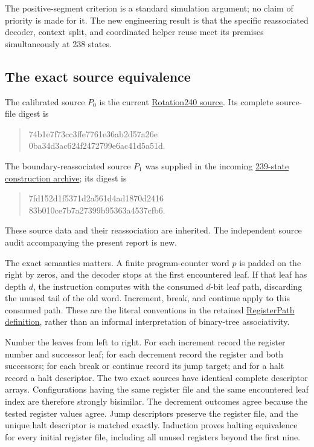 The positive-segment criterion is a standard simulation argument; no claim
of priority is made for it.  The new engineering result is that the
specific reassociated decoder, context split, and coordinated helper reuse
meet its premises simultaneously at 238 states.

\subsection{The exact source equivalence}

The calibrated source $P_0$ is the current
\href{https://github.com/VladimirReshetnikov/ProveIt/blob/ce192939372ac7944fe2a0208c68a96d49fb5e3b/Computability/BusyBeaver/Research/ZFC/candidate-rotation240/sites_logical.json}
{Rotation240 source}.  Its complete source-file digest is
\begin{quote}\small\ttfamily
74b1e7f73cc3ffe7761e36ab2d57a26e\\
0ba34d3ac624f2472799e6ac41d5a51d.
\end{quote}
The boundary-reassociated source $P_1$ was supplied in the incoming
\href{https://github.com/VladimirReshetnikov/ProveIt/blob/ce192939372ac7944fe2a0208c68a96d49fb5e3b/docs/incoming/ZFC_239_State_Construction_2026-10-19.zip}
{239-state construction archive}; its digest is
\begin{quote}\small\ttfamily
7fd152d1f5371d2a561d4ad1870d2416\\
83b010ce7b7a27399b95363a4537cfb6.
\end{quote}
These source data and their reassociation are inherited.  The independent
source audit accompanying the present report is new.

The exact semantics matters.  A finite program-counter word $p$ is padded
on the right by zeros, and the decoder stops at the first encountered
leaf.  If that leaf has depth $d$, the instruction computes with the
consumed $d$-bit leaf path, discarding the unused tail of the old word.
Increment, break, and continue apply to this consumed path.  These are the
literal conventions in the retained
\href{https://github.com/VladimirReshetnikov/ProveIt/blob/ce192939372ac7944fe2a0208c68a96d49fb5e3b/Computability/BusyBeaver/Lean/BusyBeaver/ZFC/RegisterPath.lean}
{RegisterPath definition}, rather than an informal interpretation of
binary-tree associativity.

Number the leaves from left to right.  For each increment record the
register number and successor leaf; for each decrement record the
register and both successors; for each break or continue record its jump
target; and for a halt record a halt descriptor.  The two exact sources
have identical complete descriptor arrays.  Configurations having the
same register file and the same encountered leaf index are therefore
strongly bisimilar.  The decrement outcomes agree because the tested
register values agree.  Jump descriptors preserve the register file,
and the unique halt descriptor is matched exactly.  Induction proves
halting equivalence for every initial register file, including all unused
registers beyond the first nine.

